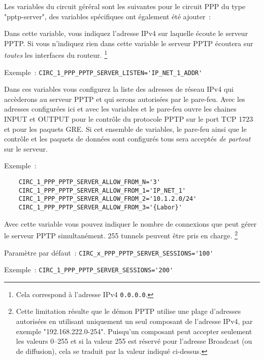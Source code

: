 Les variables du circuit géréral sont les suivantes pour le circuit PPP du type
"pptp-server", des variables spécifiques ont également été ajouter~:

\begin{description}

Dans cette variable, vous indiquez l'adresse IPv4 sur laquelle écoute le serveur
PPTP. Si vous n'indiquez rien dans cette variable le serveur PPTP écoutera sur
\emph{toutes} les interfaces du routeur. \footnote{Cela correspond à l'adresse
IPv4 \texttt{0.0.0.0}.}

Exemple~: \verb+CIRC_1_PPP_PPTP_SERVER_LISTEN='IP_NET_1_ADDR'+


Dans ces variables vous configurez la liste des adresses de réseau IPv4 qui
accèderons au serveur PPTP et qui serons autorisées par le pare-feu. Avec les
adresses configurées ici et avec les variables 
 et
 le pare-feu ouvre
les chaines INPUT et OUTPUT pour le contrôle du protocole PPTP sur le port TCP
1723 et pour les paquets GRE. Si cet ensemble de variables, le pare-feu ainsi
que le contrôle et les paquets de données sont configurés tous sera acceptés
\emph{de partout} sur le serveur.

Exemple~:

\begin{example}
\begin{verbatim}
    CIRC_1_PPP_PPTP_SERVER_ALLOW_FROM_N='3'
    CIRC_1_PPP_PPTP_SERVER_ALLOW_FROM_1='IP_NET_1'
    CIRC_1_PPP_PPTP_SERVER_ALLOW_FROM_2='10.1.2.0/24'
    CIRC_1_PPP_PPTP_SERVER_ALLOW_FROM_3='{Labor}'
\end{verbatim}
\end{example}


Avec cette variable vous pouvez indiquer le nombre de connexions que peut gérer
le serveur PPTP simultanément. 255 tunnels peuvent être pris en charge.
\footnote{Cette limitation résulte que le démon PPTP utilise une plage d'adresses
autorisées en utilisant uniquement un seul composant de l'adresse IPv4, par exemple
"192.168.222.0-254". Puisqu'un composant peut accepter seulement les valeurs 0--255
et si la valeur 255 est réservé pour l'adresse Broadcast (ou de diffusion), cela
se traduit par la valeur indiqué ci-dessus.}

Paramètre par défaut~: \verb+CIRC_x_PPP_PPTP_SERVER_SESSIONS='100'+

Exemple~: \verb+CIRC_1_PPP_PPTP_SERVER_SESSIONS='200'+

\end{description}

